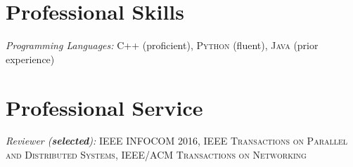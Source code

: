 \documentclass[line,11pt,letter]{F:/Dropbox (Personal)/personal-stuffs/CV/LaTeX/includes/cls/myRes}
\begin{document}
\begin{resume}
\section{Professional Skills}
\vspace{-4pt}
\setlength{\parskip}{0pt}
{\sl Programming Languages:} \textsc{C++} (proficient), \textsc{Python} (fluent), \textsc{Java} (prior experience)\\
\vspace*{4pt}
\negspace



\section{Professional Service}
\vspace{-4pt}
\setlength{\parskip}{0pt}
{\sl Reviewer ({\bf selected}):} \textsc{IEEE INFOCOM 2016}, \textsc{IEEE Transactions on Parallel and Distributed Systems}, \textsc{IEEE/ACM Transactions on Networking}\\
% 
\end{resume}
\end{document}
